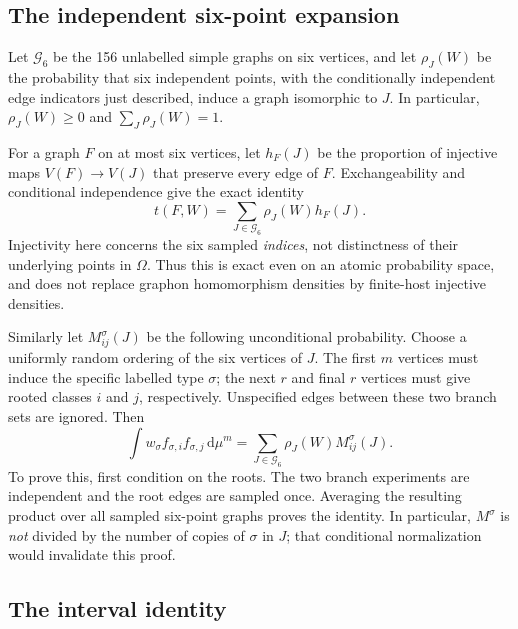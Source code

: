 \documentclass[11pt]{article}
\newcommand{\dd}{\,\mathrm d}
\begin{document}
\subsection{The independent six-point expansion}

Let $\mathcal G_6$ be the 156 unlabelled simple graphs on six vertices, and
let $\rho_J(W)$ be the probability that six independent points, with the
conditionally independent edge indicators just described, induce a graph
isomorphic to $J$.  In particular, $\rho_J(W)\ge0$ and
$\sum_J\rho_J(W)=1$.

For a graph $F$ on at most six vertices, let $h_F(J)$ be the proportion of
injective maps $V(F)\to V(J)$ that preserve every edge of $F$.  Exchangeability
and conditional independence give the exact identity
\begin{equation}
 t(F,W)=\sum_{J\in\mathcal G_6}\rho_J(W)h_F(J).
 \label{eq:hom-expansion}
\end{equation}
Injectivity here concerns the six sampled \emph{indices}, not distinctness
of their underlying points in $\Omega$.  Thus this is exact even on an atomic
probability space, and does not replace graphon homomorphism densities by
finite-host injective densities.

Similarly let $M^\sigma_{ij}(J)$ be the following unconditional probability.
Choose a uniformly random ordering of the six vertices of $J$.  The first
$m$ vertices must induce the specific labelled type $\sigma$; the next $r$
and final $r$ vertices must give rooted classes $i$ and $j$, respectively.
Unspecified edges between these two branch sets are ignored.  Then
\begin{equation}
 \int w_\sigma f_{\sigma,i}f_{\sigma,j}\dd\mu^m
   =\sum_{J\in\mathcal G_6}\rho_J(W)M^\sigma_{ij}(J).
 \label{eq:gram-expansion}
\end{equation}
To prove this, first condition on the roots.  The two branch experiments
are independent and the root edges are sampled once.  Averaging the resulting
product over all sampled six-point graphs proves the identity.  In
particular, $M^\sigma$ is \emph{not} divided by the number of copies of
$\sigma$ in $J$; that conditional normalization would invalidate this proof.

\subsection{The interval identity}
\end{document}
